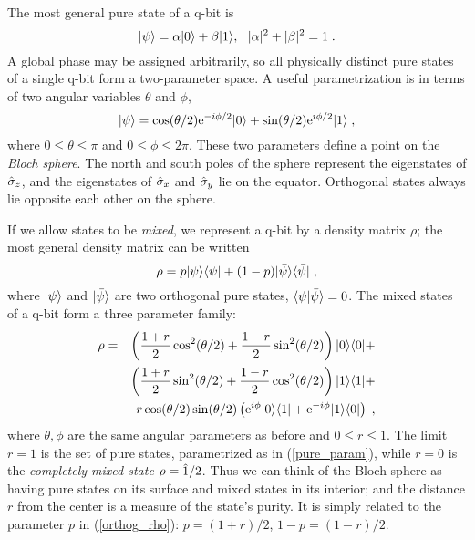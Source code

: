 The most general pure state of a q-bit is
\begin{equation}
\ket\psi = \alpha\ket0 + \beta\ket1,\ \ |\alpha|^2 + |\beta|^2 = 1 \;.
\label{qbit_pure}
\end{equation}
A global phase may be assigned arbitrarily, so all physically distinct
pure states of a single q-bit form a two-parameter space.
A useful parametrization is in terms of two angular variables
$\theta$ and $\phi$,
\begin{equation}
{| \psi \rangle} = \cos(\theta/2){\rm e}^{-i\phi/2} {| 0 \rangle}
  + \sin(\theta/2){\rm e}^{i\phi/2} {| 1 \rangle} \;,
\label{pure_param}
\end{equation}
where $0 \le \theta \le \pi$ and $0 \le \phi \le 2\pi$.  These two
parameters define a point on the {\it Bloch sphere}.  The north
and south poles of the sphere represent the eigenstates of ${\hat\sigma_z}$, and
the eigenstates of ${\hat\sigma_x}$ and ${\hat\sigma_y}$ lie on the equator.  Orthogonal states
always lie opposite each other on the sphere.

If we allow states to be {\it mixed}, we represent a q-bit by a density
matrix $\rho$; the most general density matrix can be written
\begin{equation}
\rho = p {| \psi \rangle}{\langle \psi |} + (1-p) {| \bar\psi \rangle}{\langle \bar\psi |} \;,
\label{orthog_rho}
\end{equation}
where ${| \psi \rangle}$ and ${| \bar\psi \rangle}$ are two orthogonal pure states,
${\langle \psi | \bar\psi \rangle}=0$.  The mixed states of a q-bit
form a three parameter family:
\begin{eqnarray}
\rho &=& \left( {1+r\over2}\cos^2(\theta/2)
  + {1-r\over2}\sin^2(\theta/2) \right) {| 0 \rangle}{\langle 0 |} + \nonumber\\
&& \left( {1+r\over2}\sin^2(\theta/2)
  + {1-r\over2}\cos^2(\theta/2) \right) {| 1 \rangle}{\langle 1 |} + \nonumber\\
&& r \cos(\theta/2) \sin(\theta/2)
  \left( {\rm e}^{i\phi} {| 0 \rangle}{\langle 1 |} + {\rm e}^{-i\phi} {| 1 \rangle}{\langle 0 |} \right) \;,
\label{qbit_mixed}
\end{eqnarray}
where $\theta,\phi$ are the same angular parameters as before and
$0\le r \le 1$.  The limit $r=1$ is the set of pure states, parametrized as
in (\ref{pure_param}), while $r=0$ is the {\it completely mixed state}
$\rho={\hat 1}/2$.
Thus we can think of the Bloch sphere as having pure states on its surface
and mixed states in its interior; and the distance $r$ from the center is a
measure of the state's purity.  It is simply related to the parameter
$p$ in (\ref{orthog_rho}):  $p = (1+r)/2$, $1-p = (1-r)/2$.

